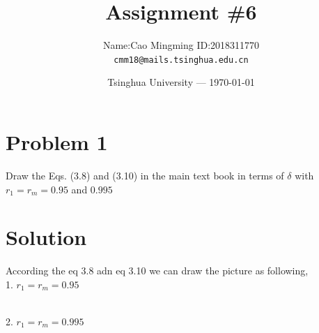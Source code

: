 \documentclass{article}
\title{Assignment \#6}
\author{Name:Cao Mingming \indent \indent ID:2018311770\\ \texttt{cmm18@mails.tsinghua.edu.cn}}
\date{Tsinghua University --- \today}
\begin{document}
\maketitle %

\section{Problem 1} %
Draw the Eqs. (3.8) and (3.10) in the main text book in terms of $\delta$ with $r_1=r_m=0.95$ and $0.995$
\section*{Solution}
According the eq 3.8 adn eq 3.10 we can draw the picture as following,\\
1. $r_1=r_m=0.95$
\begin{figure}[htb]
    \centering
    \hspace{0.5in}
    \label{fig1}  %
\end{figure}
\\
2. $r_1=r_m=0.995$
\end{document}
